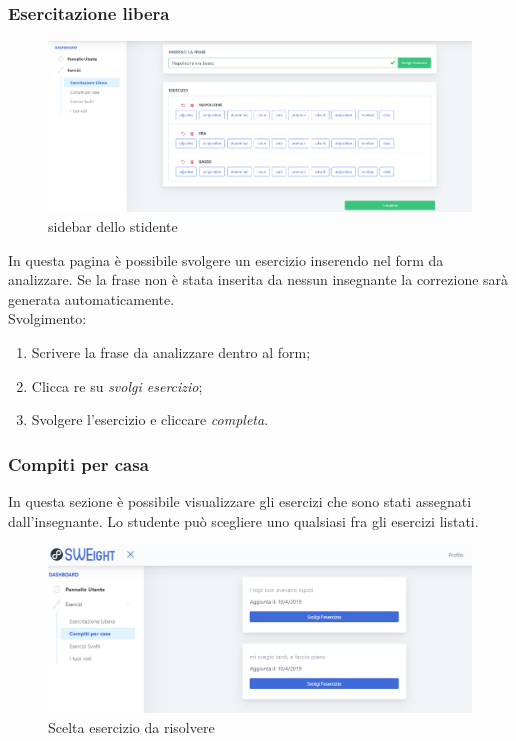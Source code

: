         
               
	\newpage
        \subsubsection{Esercitazione libera}      
        	\begin{figure}[H]
                \centering
                \includegraphics[width=17cm]{sez/img/studente/esercitazioneLiberaEsegui.PNG} 
                \caption{sidebar dello stidente}\label{fig:1}
        	\end{figure}
          In questa pagina è possibile svolgere un esercizio inserendo nel form da analizzare.
          Se la frase non è stata inserita da nessun insegnante la 
        correzione sarà generata automaticamente.
        \\ Svolgimento:
        	\begin{enumerate}        
            	\item Scrivere la frase da analizzare dentro al form;
            	\item Clicca re su \textit{svolgi esercizio};
            	\item Svolgere l'esercizio e cliccare \textit{completa}.
        	\end{enumerate}

      
        \newpage
  		\subsubsection{Compiti per casa}
 		  In questa sezione è possibile visualizzare gli esercizi che sono stati assegnati dall'insegnante. Lo studente può scegliere uno qualsiasi fra gli esercizi listati.
        	\begin{figure}[H]
            	\centering
            	\includegraphics[width=17cm]{sez/img/studente/compitopercasa.PNG} 
            	\caption{Scelta esercizio da risolvere}\label{fig:1}
        	\end{figure}

